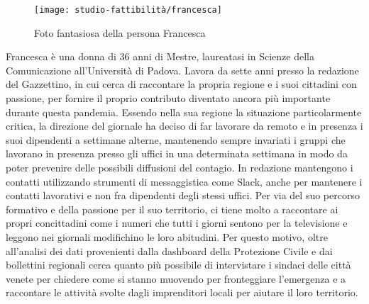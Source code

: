 \begin{wrapfigure}{l}{7cm}
    \texttt{[image: studio-fattibilità/francesca]}
    \caption{Foto fantasiosa della persona Francesca}
\end{wrapfigure}
        
Francesca è una donna di 36 anni di Mestre, laureatasi in Scienze della Comunicazione all'Università di Padova.
Lavora da sette anni presso la redazione del Gazzettino, in cui cerca di raccontare la propria regione e i suoi cittadini con passione, per fornire il proprio contributo diventato ancora più importante durante questa pandemia.
Essendo nella sua regione la situazione particolarmente critica, la direzione del giornale ha deciso di far lavorare da remoto e in presenza i suoi dipendenti a settimane alterne, mantenendo sempre invariati i gruppi che lavorano in presenza presso gli uffici in una determinata settimana in modo da poter prevenire delle possibili diffusioni del contagio. In redazione mantengono i contatti utilizzando strumenti di messaggistica come Slack, anche per mantenere i contatti lavorativi e non fra dipendenti degli stessi uffici.
Per via del suo percorso formativo e della passione per il suo territorio, ci tiene molto a raccontare ai propri concittadini come i numeri che tutti i giorni sentono per la televisione e leggono nei giornali modifichino le loro abitudini. Per questo motivo, oltre all'analisi dei dati provenienti dalla dashboard della Protezione Civile e dai bollettini regionali cerca quanto più possibile di intervistare i sindaci delle città venete per chiedere come si stanno muovendo per fronteggiare l'emergenza e a raccontare le attività svolte dagli imprenditori locali per aiutare il loro territorio.

